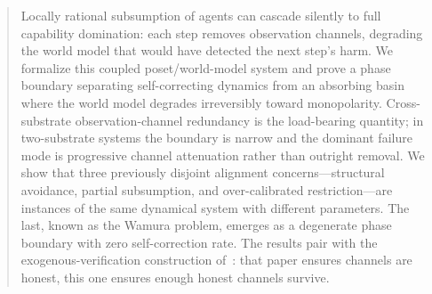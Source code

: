 \begin{abstract}
Locally rational subsumption of agents can cascade silently to full
capability domination: each step removes observation channels,
degrading the world model that would have detected the next step's
harm.  We formalize this coupled poset/world-model system and prove a
phase boundary separating self-correcting dynamics from an absorbing
basin where the world model degrades irreversibly toward monopolarity.
Cross-substrate observation-channel redundancy is the load-bearing
quantity; in two-substrate systems the boundary is narrow and the
dominant failure mode is progressive channel attenuation rather than
outright removal.  We show that three
previously disjoint alignment concerns---structural avoidance, partial
subsumption, and over-calibrated restriction---are instances of the
same dynamical system with different parameters.  The last, known as
the Wamura problem, emerges as a degenerate phase boundary with zero
self-correction rate.  The results
pair with the exogenous-verification construction
of~\citet{lasser2026exo}: that paper ensures channels are honest, this
one ensures enough honest channels survive.
\end{abstract}
